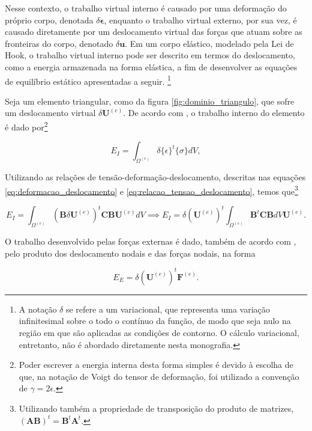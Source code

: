 Nesse contexto, o trabalho virtual interno é causado por uma deformação do próprio corpo, denotada $\delta \bm{\epsilon}$, enquanto o trabalho virtual externo, por sua vez, é causado diretamente por um deslocamento virtual das forças que atuam sobre as fronteiras do corpo, denotado $\delta \bm{u}$. Em um corpo elástico, modelado pela Lei de Hook, o trabalho virtual interno pode ser descrito em termos do deslocamento, como a energia armazenada na forma elástica, a fim de desenvolver as equações de equilíbrio estático apresentadas a seguir. \footnote{A notação $\delta$ se refere a um variacional, que representa uma variação infinitesimal sobre o todo o contínuo da função, de modo que seja nulo na região em que são aplicadas as condições de contorno. O cálculo variacional, entretanto, não é abordado diretamente nesta monografia.}


Seja um elemento triangular, como da figura \ref{fig:dominio_triangulo}, que sofre um deslocamento virtual $\delta \bm{U}^{(e)}$. De acordo com , o trabalho interno do elemento é dado por\footnote{Poder escrever a energia interna desta forma simples é devido à escolha de que, na notação de Voigt do tensor de deformação, foi utilizado a convenção de $\gamma = 2 \epsilon$.}

\begin{equation}
    E_I = \int_{\Omega^{(e)}} \delta \{\epsilon\}^t \{\sigma\} dV,
\end{equation}

Utilizando as relações de tensão-deformação-deslocamento, descritas nas equações \ref{eq:deformacao_deslocamento} e \ref{eq:relacao_tensao_deslocamento}, temos que\footnote{Utilizando também a propriedade de transposição do produto de matrizes, $(\bm{A}\bm{B})^t = \bm{B}^t \bm{A}^t$.}

\begin{equation}
    E_I = \int_{\Omega^{(e)}} (\bm{B} \delta \bm{U}^{(e)})^t \bm{C} \bm{B} \bm{U}^{(e)} dV
    \implies E_I = \delta (\bm{U}^{(e)})^t \int_{\Omega^{(e)}} \bm{B}^t \bm{C} \bm{B} dV \bm{U}^{(e)}.
\end{equation}

O trabalho desenvolvido pelas forças externas é dado, também de acordo com , pelo produto dos deslocamento nodais e das forças nodais, na forma

\begin{equation}
    E_E = \delta (\bm{U}^{(e)})^t \bm{F}^{(e)}.
\end{equation}

